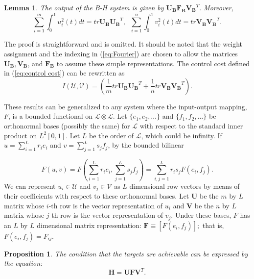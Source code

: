 \documentclass[12pt,onecolumn,draftcls]{IEEEtran}
\newtheorem{proposition}{Proposition}[section]
\newtheorem{lemma}{Lemma}[section]
\begin{document}
\begin{lemma}
The output of the B-H system is given by 
$\mathbf{U_B} \mathbf{F_B} \mathbf{V_B}^T.$
Moreover,
\begin{equation}
\sum_{i=1}^m \int_0^1 u_i^2(t)dt =  tr \mathbf{U_B}  \mathbf{U_B}^T, \;\;
\sum_{i=1}^n \int_0^1 v_i^2(t)dt =  tr \mathbf{V_B}  \mathbf{V_B}^T.
\end{equation}
\end{lemma}

The proof is straightforward and is omitted.  It should be noted that the weight assignment
and the indexing in (\ref{eq:Fourier}) are chosen to allow 
the matrices $\mathbf{U_B}, \mathbf{V_B}$, and $\mathbf{F_B}$ to assume these simple representations.
The control cost defined in (\ref{eq:control cost}) can be rewritten as
\begin{equation}
I(\mathcal{U},\mathcal{V}) = \left(\frac{1}{m} tr \mathbf{U_B} \mathbf{U_B}^T +
\frac{1}{n}tr \mathbf{V_B} \mathbf{V_B}^T 
\right).
\label{eq:P2}
\end{equation}

These results can be generalized to any system
where the input-output mapping, $F$, 
is a bounded functional on $\mathcal{L} \otimes \mathcal{L}$.
Let $\{e_1, e_2, \ldots \}$ and $\{f_1, f_2, \ldots \}$ be orthonormal bases (possibly the same) for $\mathcal{L}$ 
with respect to the standard inner product on $L^2[0,1]$.
Let $L$ be the order of $\mathcal{L}$, which could be infinity.
If $u=\sum_{i=1}^L r_i e_i$ and $v=\sum_{j=1}^L s_j f_j$,
by the bounded bilinear 

\begin{equation}
F(u, v) = F(\sum_{i=1}^L r_i e_i, \sum_{j=1}^L s_j f_j)=\sum_{i,j=1}^L r_is_j F(e_i,f_j).
\end{equation}
We can represent $u_i \in \mathcal{U}$ and $v_j \in \mathcal{V}$ as $L$ dimensional row vectors by means of their coefficients with respect
to these orthonormal bases.  Let
$\mathbf{U}$ be the $m$ by $L$ matrix whose $i$-th row is the vector representation of $u_i$ and
$\mathbf{V}$ be the $n$ by $L$ matrix whose $j$-th row is the vector representation of $v_j$.
Under these bases, $F$ has an $L$ by $L$ dimensional matrix representation:
$\mathbf{F}\equiv
\left[
F(e_i,f_j)
\right];$ that is,\ $F(e_i,f_j)=F_{ij}$.


\begin{proposition}
The condition that the targets are achievable can be expressed by the equation:
\begin{equation}
\mathbf{H}=\mathbf{U}\mathbf{F}\mathbf{V}^T.
\label{eq:P3}
\end{equation}
\end{proposition}
\end{document}
